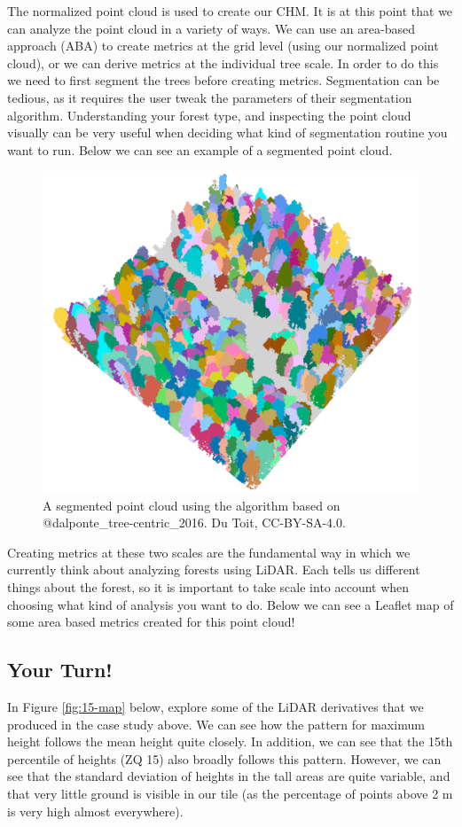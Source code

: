 \documentclass[
]{book}
\begin{document}
The normalized point cloud is used to create our CHM. It is at this point that we can analyze the point cloud in a variety of ways. We can use an area-based approach (ABA) to create metrics at the grid level (using our normalized point cloud), or we can derive metrics at the individual tree scale. In order to do this we need to first segment the trees before creating metrics. Segmentation can be tedious, as it requires the user tweak the parameters of their segmentation algorithm. Understanding your forest type, and inspecting the point cloud visually can be very useful when deciding what kind of segmentation routine you want to run. Below we can see an example of a segmented point cloud.

\begin{figure}
\includegraphics[width=0.6\linewidth]{images/15-las-segmented} \caption{A segmented point cloud using the algorithm based on @dalponte_tree-centric_2016. Du Toit, CC-BY-SA-4.0.}\label{fig:15-las-segmented}
\end{figure}

Creating metrics at these two scales are the fundamental way in which we currently think about analyzing forests using LiDAR. Each tells us different things about the forest, so it is important to take scale into account when choosing what kind of analysis you want to do. Below we can see a Leaflet map of some area based metrics created for this point cloud!

\subsection*{Your Turn!}\label{your-turn-6}

In Figure \ref{fig:15-map} below, explore some of the LiDAR derivatives that we produced in the case study above. We can see how the pattern for maximum height follows the mean height quite closely. In addition, we can see that the 15th percentile of heights (ZQ 15) also broadly follows this pattern. However, we can see that the standard deviation of heights in the tall areas are quite variable, and that very little ground is visible in our tile (as the percentage of points above 2 m is very high almost everywhere).
\end{document}
